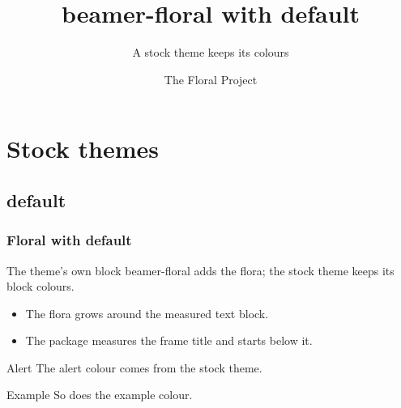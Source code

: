 \documentclass[aspectratio=169]{beamer}
\title{beamer-floral with default}
\subtitle{A stock theme keeps its colours}
\author{The Floral Project}
\institute{beamer-floral}
\date{}
\begin{document}
\begin{frame}[plain]\titlepage\end{frame}
\section{Stock themes}\subsection{default}
\begin{frame}
  \frametitle{Floral with default}
  \begin{block}{The theme's own block}
    beamer-floral adds the flora; the stock theme keeps its block colours.
  \end{block}
  \begin{itemize}
    \item The flora grows around the measured text block.
    \item The package measures the frame title and starts below it.
  \end{itemize}
  \begin{alertblock}{Alert}
    The alert colour comes from the stock theme.
  \end{alertblock}
  \begin{exampleblock}{Example}
    So does the example colour.
  \end{exampleblock}
\end{frame}
\end{document}
